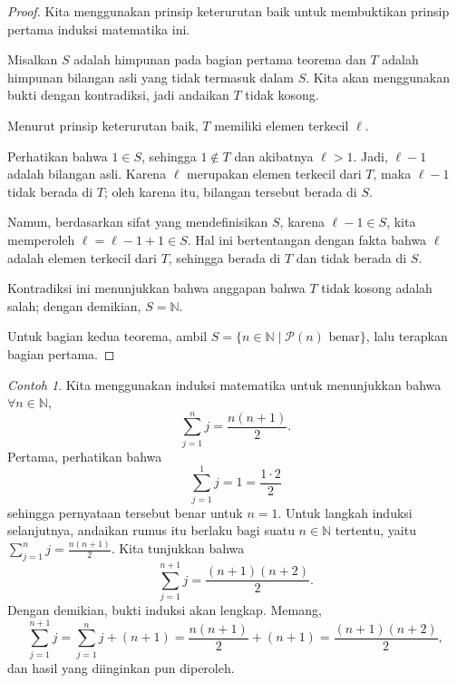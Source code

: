 \documentclass[12pt,letterpaper]{amsbook}
\theoremstyle{definition}
\theoremstyle{remark}
\newtheorem{example}[theorem]{Contoh}
\numberwithin{figure}{section}
\numberwithin{exercise}{section}
\numberwithin{section}{chapter}
\numberwithin{equation}{section}
\numberwithin{table}{section}
\newcommand{\NN}{{\mathbb N}}
\newcommand{\Pp}{{\mathcal P}}
\begin{document}
\begin{proof}
  Kita menggunakan prinsip keterurutan baik untuk membuktikan prinsip pertama
induksi matematika ini.

Misalkan $S$ adalah himpunan pada bagian pertama teorema dan $T$ adalah himpunan
bilangan asli yang tidak termasuk dalam $S$. Kita akan menggunakan bukti dengan
kontradiksi, jadi andaikan $T$ tidak kosong.

Menurut prinsip keterurutan baik,
$T$ memiliki elemen terkecil $\ell$.

Perhatikan bahwa $1\in S$, sehingga $1\notin T$ dan akibatnya $\ell>1$. Jadi,
$\ell-1$ adalah bilangan asli. Karena $\ell$ merupakan elemen terkecil dari
$T$, maka $\ell-1$ tidak berada di $T$; oleh karena itu, bilangan tersebut
berada di $S$.

Namun, berdasarkan sifat yang mendefinisikan $S$, karena $\ell-1\in S$, kita
memperoleh $\ell=\ell-1+1\in S$. Hal ini bertentangan dengan fakta bahwa
$\ell$ adalah elemen terkecil dari $T$, sehingga berada di $T$ dan tidak berada
di $S$.

Kontradiksi ini menunjukkan bahwa anggapan bahwa $T$ tidak kosong adalah salah;
dengan demikian, $S=\NN$.

Untuk bagian kedua teorema, ambil
$S=\{n\in\NN\mid\Pp(n)\text{ benar}\}$, lalu terapkan bagian pertama.
\end{proof}

\begin{example}\label{eg:inductionv1a}
Kita menggunakan induksi matematika untuk menunjukkan bahwa
$\forall n\in \mathbb{N}$,
\begin{equation}
\sum_{j=1}^nj=\frac{n(n+1)}{2}.
\end{equation}
Pertama, perhatikan bahwa
\begin{equation*}
\sum_{j=1}^1j=1=\frac{1\cdot 2}{2}
\end{equation*}
sehingga pernyataan tersebut benar untuk $n=1$. Untuk langkah induksi
selanjutnya, andaikan rumus itu berlaku bagi suatu $n\in\NN$ tertentu, yaitu
$\sum_{j=1}^nj=\frac{n(n+1)}{2}$. Kita tunjukkan bahwa
\begin{equation*}
\sum_{j=1}^{n+1}j=\frac{(n+1)(n+2)}{2}.
\end{equation*}
Dengan demikian, bukti induksi akan lengkap. Memang,
\begin{equation*}
\sum_{j=1}^{n+1}j=\sum_{j=1}^nj+(n+1)=\frac{n(n+1)}{2}+(n+1)=\frac{(n+1)(n+2)}{2},
\end{equation*}
dan hasil yang diinginkan pun diperoleh.
\end{example}
\end{document}
